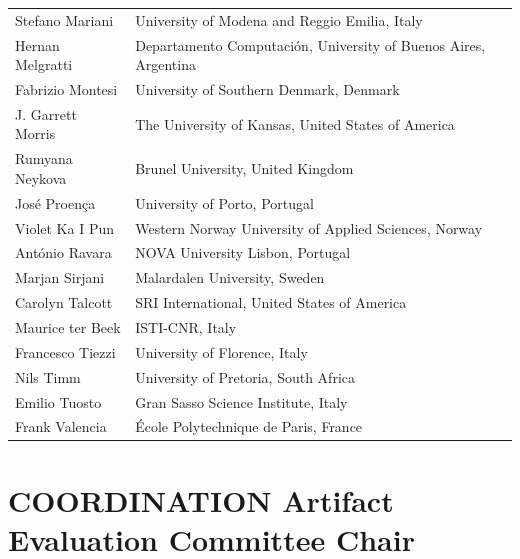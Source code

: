 \documentclass[]{llncs}
\begin{document}
\begin{longtable}{p{}p{}}
Stefano Mariani & University of Modena and Reggio Emilia, Italy\\

Hernan Melgratti & Departamento Computaci\'on, University of Buenos Aires, Argentina\\


Fabrizio Montesi & University of Southern Denmark, Denmark\\

J. Garrett Morris & The University of Kansas, United States of America\\

Rumyana Neykova & Brunel University, United Kingdom\\

Jos\'e Proen\c{c}a & University of Porto, Portugal\\

Violet Ka I Pun & Western Norway University of Applied Sciences, Norway\\

Ant\'onio Ravara & NOVA University Lisbon, Portugal\\

Marjan Sirjani & Malardalen University, Sweden\\

Carolyn Talcott & SRI  International, United States of America\\

Maurice ter Beek & ISTI-CNR, Italy\\

Francesco Tiezzi & University of Florence, Italy\\

Nils Timm & University of Pretoria, South Africa\\

Emilio Tuosto & Gran Sasso Science Institute, Italy\\

Frank Valencia & École Polytechnique de Paris, France\\

\end{longtable}

\clearpage

\section*{COORDINATION Artifact Evaluation Committee Chair}
\end{document}
